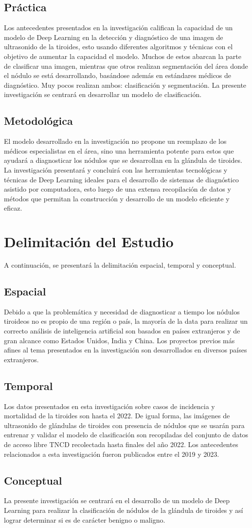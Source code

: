 \subsection{Práctica}
Los antecedentes presentados en la investigación califican la capacidad de un modelo de Deep Learning en la detección y diagnóstico de una imagen de ultrasonido de la tiroides, esto usando diferentes algoritmos y técnicas con el objetivo de aumentar la capacidad el modelo. Muchos de estos abarcan la parte de clasificar una imagen, mientras que otros realizan segmentación del área donde el nódulo se está desarrollando, basándose además en estándares médicos de diagnóstico. Muy pocos realizan ambos: clasificación y segmentación. La presente investigación se centrará en desarrollar un modelo de clasificación. 

\subsection{Metodológica}
El modelo desarrollado en la investigación no propone un reemplazo de los médicos especialistas en el área, sino una herramienta potente para estos que ayudará a diagnosticar los nódulos que se desarrollan en la glándula de tiroides. La investigación presentará y concluirá con las herramientas tecnológicas y técnicas de Deep Learning ideales para el desarrollo de sistemas de diagnóstico asistido por computadora, esto luego de una extensa recopilación de datos y métodos que permitan la construcción y desarrollo de un modelo eficiente y eficaz.

\section{Delimitación del Estudio}
A continuación, se presentará la delimitación espacial, temporal y conceptual.

\subsection{Espacial}
Debido a que la problemática y necesidad de diagnosticar a tiempo los nódulos tiroideos no es propio de una región o país, la mayoría de la data para realizar un correcto análisis de inteligencia artificial son basados en países extranjeros y de gran alcance como Estados Unidos, India y China. Los proyectos previos más afines al tema presentados en la investigación son desarrollados en diversos países extranjeros. 

\subsection{Temporal}
Los datos presentados en esta investigación sobre casos de incidencia y mortalidad de la tiroides son hasta el 2022. De igual forma, las imágenes de ultrasonido de glándulas de tiroides con presencia de nódulos que se usarán para entrenar y validar el modelo de clasificación son recopiladas del conjunto de datos de acceso libre TNCD recolectada hasta finales del año 2022. Los antecedentes relacionados a esta investigación fueron publicados entre el 2019 y 2023.

\subsection{Conceptual}
La presente investigación se centrará en el desarrollo de un modelo de Deep Learning para realizar la clasificación de nódulos de la glándula de tiroides y así lograr determinar si es de carácter benigno o maligno. 
